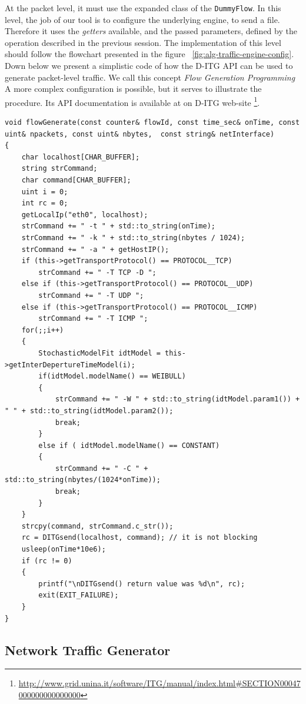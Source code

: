 At the packet level, it must use the expanded class of the \texttt{DummyFlow}. In this level, the job of our tool is to configure the underlying engine, to send a file. Therefore it uses the \textit{getters} available, and the passed parameters, defined by the operation described in the previous session. The implementation of this level should follow the flowchart presented in the figure ~\ref{fig:alg-traffic-engine-config}.
Down below we present a simplistic code of how the D-ITG API can be used to generate packet-level traffic. We call this concept \textit{Flow Generation Programming} A more complex configuration is possible, but it serves to illustrate the procedure. Its API documentation is available at on D-ITG web-site \footnote{\href{http://www.grid.unina.it/software/ITG/manual/index.html\#SECTION00047000000000000000}{http://www.grid.unina.it/software/ITG/manual/index.html\#SECTION00047000000000000000}}. 
\begin{verbatim}
void flowGenerate(const counter& flowId, const time_sec& onTime, const uint& npackets, const uint& nbytes,  const string& netInterface)
{
	char localhost[CHAR_BUFFER];
	string strCommand;
	char command[CHAR_BUFFER];
	uint i = 0;
	int rc = 0;
	getLocalIp("eth0", localhost);
	strCommand += " -t " + std::to_string(onTime); 
	strCommand += " -k " + std::to_string(nbytes / 1024);
	strCommand += " -a " + getHostIP();
	if (this->getTransportProtocol() == PROTOCOL__TCP)
		strCommand += " -T TCP -D ";
	else if (this->getTransportProtocol() == PROTOCOL__UDP)
		strCommand += " -T UDP ";
	else if (this->getTransportProtocol() == PROTOCOL__ICMP)
		strCommand += " -T ICMP ";
	for(;;i++)
	{	
		StochasticModelFit idtModel = this->getInterDepertureTimeModel(i);
		if(idtModel.modelName() == WEIBULL)
		{
			strCommand += " -W " + std::to_string(idtModel.param1()) + " " + std::to_string(idtModel.param2());
			break;
		}
		else if ( idtModel.modelName() == CONSTANT)
		{
			strCommand += " -C " + std::to_string(nbytes/(1024*onTime));
			break;
		}
	}
	strcpy(command, strCommand.c_str());
	rc = DITGsend(localhost, command); // it is not blocking
    usleep(onTime*10e6);
	if (rc != 0)
	{
		printf("\nDITGsend() return value was %d\n", rc);
		exit(EXIT_FAILURE);
	}
}
\end{verbatim}

\subsection{Network Traffic Generator}


